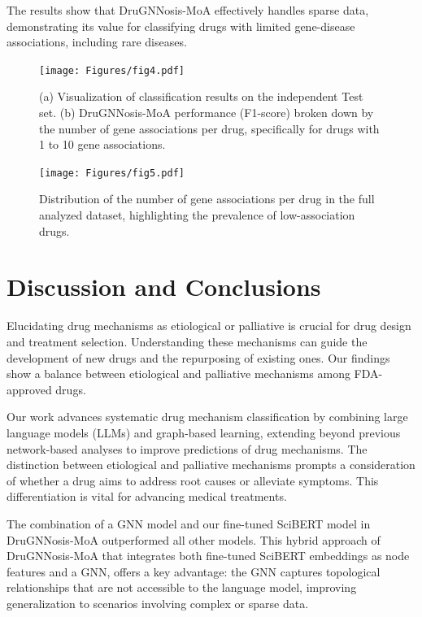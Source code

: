 \documentclass[journal,twoside,web]{ieeecolor}
\begin{document}
The results show that DruGNNosis-MoA effectively handles sparse data, demonstrating its value for classifying drugs with limited gene-disease associations, including rare diseases.


\begin{figure}
\centering
   \texttt{[image: Figures/fig4.pdf]}
   \caption{
            (a) Visualization of classification results on the independent Test set.
            (b) DruGNNosis-MoA performance (F1-score) broken down by the number of gene associations per drug, specifically for drugs with 1 to 10 gene associations.
            }
\label{fig:class}
\end{figure}



\begin{figure}
\centering
   \texttt{[image: Figures/fig5.pdf]}
   \caption{
             Distribution of the number of gene associations per drug in the full analyzed dataset, highlighting the prevalence of low-association drugs.
            }
\label{fig:genes_per_drug}
\end{figure}


\section{Discussion and Conclusions}
Elucidating drug mechanisms as etiological or palliative is crucial for drug design and treatment selection. 
Understanding these mechanisms can guide the development of new drugs and the repurposing of existing ones. 
Our findings show a balance between etiological and palliative mechanisms among FDA-approved drugs.

Our work advances systematic drug mechanism classification by combining large language models (LLMs) and graph-based learning, extending beyond previous network-based analyses to improve predictions of drug mechanisms.
The distinction between etiological and palliative mechanisms prompts a consideration of whether a drug aims to address root causes or alleviate symptoms. 
This differentiation is vital for advancing medical treatments.

The combination of a GNN model and our fine-tuned SciBERT model in DruGNNosis-MoA outperformed all other models. 
This hybrid approach of DruGNNosis-MoA that integrates both fine-tuned SciBERT embeddings as node features and a GNN, offers a key advantage: the GNN captures topological relationships that are not accessible to the language model, improving generalization to scenarios involving complex or sparse data.
\end{document}
